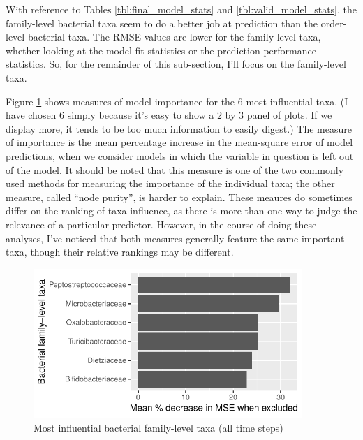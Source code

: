 \documentclass{article}
\begin{document}
With reference to Tables \ref{tbl:final_model_stats} and
\ref{tbl:valid_model_stats}, the family-level bacterial taxa seem to
do a better job at prediction than the order-level bacterial taxa.
The RMSE values are lower for the family-level taxa, whether looking
at the model fit statistics or the prediction performance statistics.
So, for the remainder of this sub-section, I'll focus on the
family-level taxa.

Figure \ref{fig:infl_bac_family_taxa} shows measures of model
importance for the 6 most influential taxa.  (I have chosen 6
simply because it's easy to show a 2 by 3 panel of plots.  If we
display more, it tends to be too much information to easily digest.)
The measure of importance is the mean percentage increase in the
mean-square error of model predictions, when we consider models in
which the variable in question is left out of the model.  It should be
noted that this measure is one of the two commonly used methods for
measuring the importance of the individual taxa; the other measure,
called ``node purity'', is harder to explain.  These meaures do
sometimes differ on the ranking of taxa influence, as there is more
than one way to judge the relevance of a particular predictor.
However, in the course of doing these analyses, I've noticed that both
measures generally feature the same important taxa, though their
relative rankings may be different.
\begin{figure}
  \centering
  \includegraphics[width=4in]{../revise_algorithm/only_families/all_time_steps/hit_1perc_twice/orig_units_all_data_families_PercIncMSE_barchart}
  \caption{Most influential bacterial family-level taxa (all time steps)}
  \label{fig:infl_bac_family_taxa}
\end{figure}
\end{document}
